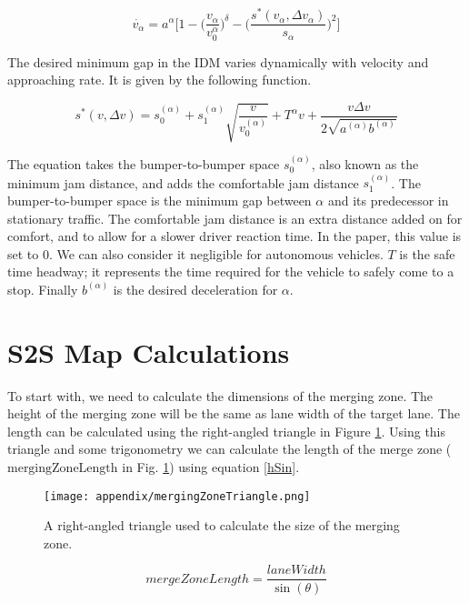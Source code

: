 \begin{appendices}
\begin{equation}
\dot{v_\alpha} = a^{\alpha}\Biggl[1 - \biggl(\frac{v_\alpha}{v_0^\alpha}\biggr)^\delta - \biggl(\frac{s^*(v_\alpha,\Delta v_\alpha)}{s_\alpha}\biggr)^2\Biggr]
\end{equation}

The desired minimum gap in the IDM varies dynamically with velocity and approaching rate. It is given by the following function.

\begin{equation}\label{IDMSpacingFunction}
s^*(v,\Delta v) = s_0^{(\alpha)} + s_1^{(\alpha)}\sqrt{\frac{v}{v_0^{(\alpha)}}} + T^\alpha v + \frac{v\Delta v}{2\sqrt{a^{(\alpha)}b^{(\alpha)}}}
\end{equation}

The equation takes the bumper-to-bumper space $s_0^{(\alpha)}$, also known as the minimum jam distance, and adds the comfortable jam distance $s_1^{(\alpha)}$. The bumper-to-bumper space is the minimum gap between $\alpha$ and its predecessor in stationary traffic. The comfortable jam distance is an extra distance added on for comfort, and to allow for a slower driver reaction time. In the paper, this value is set to $0$. We can also consider it negligible for autonomous vehicles. $T$ is the safe time headway; it represents the time required for the vehicle to safely come to a stop. Finally $b^{(\alpha)}$ is the desired deceleration for $\alpha$.

\section{S2S Map Calculations}
\label{sec:S2SMapCalculations}
To start with, we need to calculate the dimensions of the merging zone. The height of the merging zone will be the same as lane width of the target lane. The length can be calculated using the right-angled triangle in Figure \ref{fig:mergingZoneTriangle}. Using this triangle and some trigonometry we can calculate the length of the merge zone ($\text{mergingZoneLength}$ in Fig. \ref{fig:mergingZoneTriangle}) using equation \ref{hSin}.

\begin{figure}[htb]
\centering
\texttt{[image: appendix/mergingZoneTriangle.png]}
\caption{A right-angled triangle used to calculate the size of the merging zone.}
\label{fig:mergingZoneTriangle}
\end{figure}

\begin{equation}\label{hSin}
mergeZoneLength = \frac{laneWidth}{\sin(\theta)}
\end{equation}


\end{appendices}
